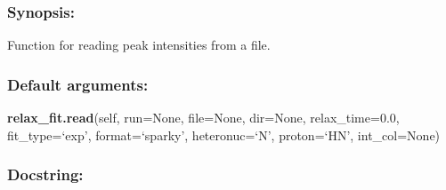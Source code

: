 \subsubsection{Synopsis:}

Function for reading peak intensities from a file.

\subsubsection{Default arguments:}

\textsf{\textbf{relax\_fit.read}(self, run=None, file=None, dir=None, relax\_time=0.0, fit\_type=`exp', format=`sparky', heteronuc=`N', proton=`HN', int\_col=None)
}


\subsubsection{Docstring:}

